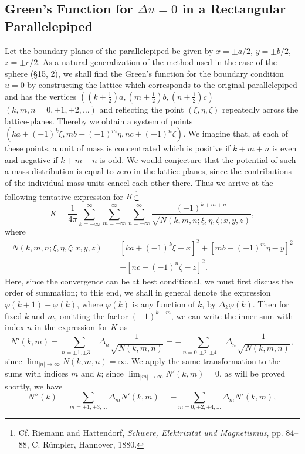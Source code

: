 \subsection{Green's Function for $\Delta u=0$ in a Rectangular Parallelepiped}
Let the boundary planes of the parallelepiped be given by $x=\pm a/2$, $y=\pm b/2$, $z=\pm c/2$. As a natural generalization of the method used in the case of the sphere (\S15, 2), we shall find the Green's function for the boundary condition $u=0$ by constructing the lattice which corresponds to the original parallelepiped and has the vertices $((k+\frac12)a,(m+\frac12)b,(n+\frac12)c)$ $(k,m,n=0,\pm1,\pm2,\ldots)$ and reflecting the point $(\xi,\eta,\zeta)$ repeatedly across the lattice-planes. Thereby we obtain a system of points $(ka+(-1)^k\xi,mb+(-1)^m\eta,nc+(-1)^n\zeta)$. We imagine that, at each of these points, a unit of mass is concentrated which is positive if $k+m+n$ is even and negative if $k+m+n$ is odd. We would conjecture that the potential of such a mass distribution is equal to zero in the lattice-planes, since the contributions of the individual mass units cancel each other there. Thus we arrive at the following tentative expression for $K$:\footnote{Cf. Riemann and Hattendorf, \emph{Schwere, Elektrizit\"at und Magnetismus}, pp. 84--88, C. R\"umpler, Hannover, 1880.}
\begin{equation}\tag{106}
K=\frac1{4\pi}\sum_{k=-\infty}^{\infty}\sum_{m=-\infty}^{\infty}\sum_{n=-\infty}^{\infty}\frac{(-1)^{k+m+n}}{\sqrt{N(k,m,n;\xi,\eta,\zeta;x,y,z)}},
\end{equation}
where
\[
\begin{aligned}
N(k,m,n;\xi,\eta,\zeta;x,y,z)
={}&[ka+(-1)^k\xi-x]^2+[mb+(-1)^m\eta-y]^2\\
&+[nc+(-1)^n\zeta-z]^2.
\end{aligned}
\]
Here, since the convergence can be at best conditional, we must first discuss the order of summation; to this end, we shall in general denote the expression $\varphi(k+1)-\varphi(k)$, where $\varphi(k)$ is any function of $k$, by $\Delta_k\varphi(k)$. Then for fixed $k$ and $m$, omitting the factor $(-1)^{k+m}$, we can write the inner sum with index $n$ in the expression for $K$ as
\[
N'(k,m)=\sum_{n=\pm1,\pm3,\ldots}\Delta_n\frac1{\sqrt{N(k,m,n)}}
=-\sum_{n=0,\pm2,\pm4,\ldots}\Delta_n\frac1{\sqrt{N(k,m,n)}},
\]
since $\lim_{|n|\to\infty}N(k,m,n)=\infty$. We apply the same transformation to the sums with indices $m$ and $k$; since $\lim_{|m|\to\infty}N'(k,m)=0$, as will be proved shortly, we have
\[
N''(k)=\sum_{m=\pm1,\pm3,\ldots}\Delta_mN'(k,m)
=-\sum_{m=0,\pm2,\pm4,\ldots}\Delta_mN'(k,m),
\]
